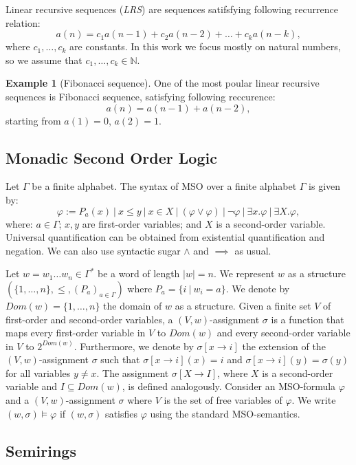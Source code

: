 \documentclass[12pt]{article}
\theoremstyle{definition}
\newtheorem{example}{Example}[section]
\begin{document}
Linear recursive sequences (\emph{LRS}) are sequences satifsfying following recurrence relation:
$$a(n) = c_1 a(n-1) + c_2 a(n-2) + \ldots + c_k a(n-k),$$
where $c_1,\ldots,c_k$ are constants. In this work we focus mostly on natural numbers, so we assume that $c_1,\ldots ,c_k \in \mathbb{N}$.

\begin{example}[Fibonacci sequence]
    One of the most poular linear recursive sequences is Fibonacci sequence, satisfying following reccurence:
    $$a(n) = a(n-1) + a(n-2),$$
    starting from $a(1) = 0$, $a(2) = 1$.
\end{example}

\subsection{Monadic Second Order Logic}

Let $\Gamma$ be a finite alphabet. The syntax of MSO over a finite alphabet $\Gamma$ is given by:
$$ \varphi := P_a(x) \ | \ x \leq y \ | \ x \in X \ | \ (\varphi \lor \varphi) \ | \ \neg \varphi \ | \ \exists x. \varphi \ | \ \exists X . \varphi, $$
where: $a \in \Gamma$; $x, y$ are first-order variables; and $X$ is a second-order variable. Universal quantification can be obtained from existential quantification and negation. We can also use syntactic sugar $\land$ and $\implies$ as usual.

Let $w = w_1\ldots w_n \in \Gamma^*$ be a word of length $|w| = n$. We represent $w$ as a structure $(\{1,\ldots,n\}, \leq, (P_a)_{a \in \Gamma})$ where $P_a = \{i \ | \ w_i = a\}$. We denote by $Dom(w) = \{1,\ldots,n\}$ the domain of $w$ as a structure. Given a finite set $V$ of first-order and second-order variables, a $(V,w)$-assignment $\sigma$ is a function that maps every first-order variable in $V$ to $Dom(w)$ and every second-order variable in $V$ to $2^{Dom(w)}$. Furthermore, we denote by $\sigma[x \rightarrow i]$ the extension of the $(V,w)$-assignment $\sigma$ such that $\sigma[x \rightarrow i](x) = i$ and $\sigma[x \rightarrow i](y) = \sigma(y)$ for all variables $y \ne x$. The assignment $\sigma[X \rightarrow I]$, where $X$ is a second-order variable and $I \subseteq Dom(w)$, is defined analogously. Consider an MSO-formula $\varphi$ and a $(V,w)$-assignment $\sigma$ where $V$ is the set of free variables of $\varphi$. We write $(w, \sigma) \models \varphi$ if $(w, \sigma)$ satisfies $\varphi$ using the standard MSO-semantics.

\subsection{Semirings}
\end{document}
